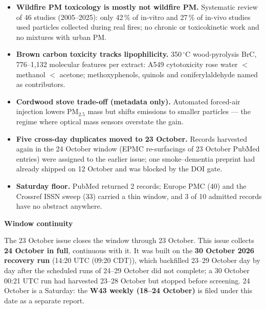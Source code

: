 \documentclass[10pt]{article}
\begin{document}
\footnotesize
\begin{itemize}

\item \textbf{Wildfire PM toxicology is mostly not wildfire PM.} Systematic review of 46 studies (2005--2025): only 42\,\%
of in-vitro and 27\,\% of in-vivo studies used particles collected during real fires; no chronic or toxicokinetic work
and no mixtures with urban PM.

\item \textbf{Brown carbon toxicity tracks lipophilicity.} 350\,$^\circ$C wood-pyrolysis BrC, 776--1,132 molecular
features per extract: A549 cytotoxicity rose water $<$ methanol $<$ acetone; methoxyphenols, quinols and
coniferylaldehyde named as contributors.

\item \textbf{Cordwood stove trade-off (metadata only).} Automated forced-air injection lowers PM$_{2.5}$ mass but shifts
emissions to smaller particles --- the regime where optical mass sensors overstate the gain.

\item \textbf{Five cross-day duplicates moved to 23 October.} Records harvested again in the 24 October window (EPMC
re-surfacings of 23 October PubMed entries) were assigned to the earlier issue; one smoke--dementia preprint had
already shipped on 12 October and was blocked by the DOI gate.

\item \textbf{Saturday floor.} PubMed returned 2 records; Europe PMC (40) and the Crossref ISSN sweep (33) carried a thin
window, and 3 of 10 admitted records have no abstract anywhere.

\end{itemize}

\vspace{2mm}

\begin{keybox}
{\sffamily\bfseries\footnotesize\color{Deep}Window continuity}\\[1.2mm]
{\fontsize{7.2}{8.8}\selectfont
The 23 October issue closes the window through 23 October. This issue collects \textbf{24 October in full},
continuous with it. It was built on the \textbf{30 October 2026 recovery run} (14:20 UTC (09:20 CDT)), which backfilled
23--29 October day by day after the scheduled runs of 24--29 October did not complete; a 30 October 00:21 UTC run had
harvested 23--28 October but stopped before screening. 24 October is a Saturday: the \textbf{W43 weekly (18--24
October)} is filed under this date as a separate report.\par}
\end{keybox}
\end{document}

